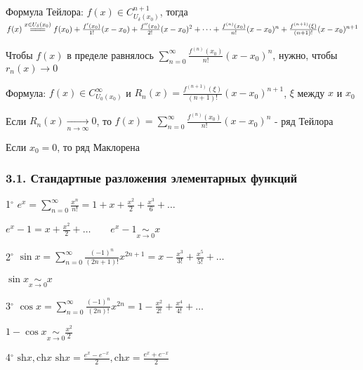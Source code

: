 \documentclass[12pt]{article}
\begin{document}
    \Mem Формула Тейлора: $f(x) \in C^{n + 1}_{U_\delta (x_0)}$, тогда $f(x) \overset{x \in U_\delta (x_0)}{=\joinrel=\joinrel=} f(x_0) + 
    \frac{f^\prime (x_0)}{1!} (x - x_0) + \frac{f^{\prime\prime} (x_0)}{2!} (x - x_0)^2 + \dots + \frac{f^{(n)} (x_0)}{n!} (x - x_0)^n + \frac{f^{(n + 1)} (\xi)}{(n + 1)!} (x - x_0)^{n + 1}$

    Чтобы $f(x)$ в пределе равнялось $\sum_{n = 0}^\infty \frac{f^{(n)}(x_0)}{n!} (x - x_0)^n$, нужно, чтобы $r_n(x) \to 0$


    Формула: $f(x) \in C^\infty_{U_0(x_0)}$ и $R_n(x) = \frac{f^{(n + 1)}(\xi)}{(n + 1)!} (x - x_0)^{n + 1}$, $\xi$ между $x$ и $x_0$

    \begin{MyTheorem}
        \Ths Если $R_n(x) \underset{n \to \infty}{\longrightarrow} 0$, то $f(x) = \sum_{n = 0}^\infty \frac{f^{(n)}(x_0)}{n!} (x - x_0)^n$ - ряд Тейлора
    \end{MyTheorem}

    \Nota Если $x_0 = 0$, то ряд Маклорена 

    \smallvspace

    \subsubsection{3.1. Стандартные разложения элементарных функций}

    \smallvspace

    1$^\circ$ $e^x = \sum_{n = 0}^\infty \frac{x^n}{n!} = 1 + x + \frac{x^2}{2} + \frac{x^3}{6} + \dots$

    \Notas $e^x - 1 = x + \frac{x^2}{2} + \dots \qquad e^x - 1 \underset{x \to 0}{\sim} x$

    \mediumvspace

    2$^\circ$ $\sin x = \sum_{n = 0}^\infty \frac{(-1)^n}{(2n + 1)!}x^{2n + 1} = x - \frac{x^3}{3!} + \frac{x^5}{5!} + \dots$

    \Notas $\sin x \underset{x \to 0}{\sim} x$

    \mediumvspace

    3$^\circ$ $\cos x = \sum_{n = 0}^\infty \frac{(-1)^n}{(2n)!}x^{2n} = 1 - \frac{x^2}{2!} + \frac{x^4}{4!} + \dots$

    \Notas $1 - \cos x \underset{x \to 0}{\sim} \frac{x^2}{2}$

    \mediumvspace

    4$^\circ$ $\mathrm{sh} x, \mathrm{ch} x$ \hfill \Defs $\mathrm{sh} x = \frac{e^x - e^{-x}}{2}, \mathrm{ch} x = \frac{e^x + e^{-x}}{2}$
    
\end{document}
